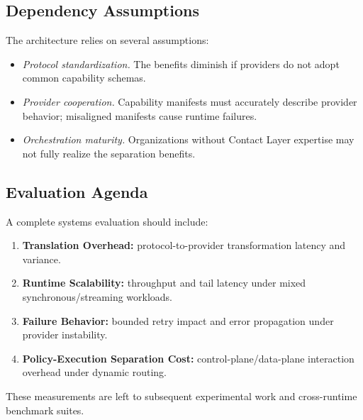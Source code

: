 \subsection{Dependency Assumptions}

The architecture relies on several assumptions:
\begin{itemize}
    \item \emph{Protocol standardization.} The benefits diminish if providers do not adopt common capability schemas.
    \item \emph{Provider cooperation.} Capability manifests must accurately describe provider behavior; misaligned manifests cause runtime failures.
    \item \emph{Orchestration maturity.} Organizations without Contact Layer expertise may not fully realize the separation benefits.
\end{itemize}

\subsection{Evaluation Agenda}

A complete systems evaluation should include:
\begin{enumerate}
    \item \textbf{Translation Overhead:} protocol-to-provider transformation latency and variance.
    \item \textbf{Runtime Scalability:} throughput and tail latency under mixed synchronous/streaming workloads.
    \item \textbf{Failure Behavior:} bounded retry impact and error propagation under provider instability.
    \item \textbf{Policy-Execution Separation Cost:} control-plane/data-plane interaction overhead under dynamic routing.
\end{enumerate}

These measurements are left to subsequent experimental work and cross-runtime benchmark suites.
